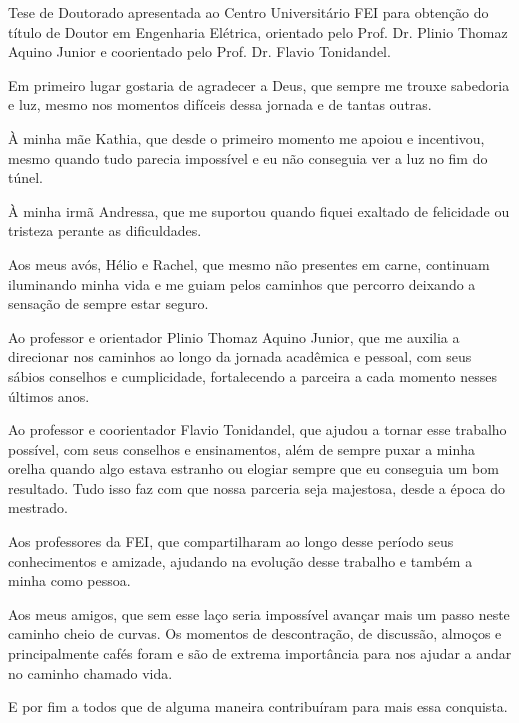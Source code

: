\maketitle{}

\begin{folhaderosto}
Tese de Doutorado apresentada ao Centro Universitário FEI para obtenção do título de Doutor em Engenharia Elétrica, orientado pelo Prof. Dr. Plinio Thomaz Aquino Junior e coorientado pelo Prof. Dr. Flavio Tonidandel.
\end{folhaderosto}

\fichacatalografica



\begin{agradecimentos}
Em primeiro lugar gostaria de agradecer a Deus, que sempre me trouxe sabedoria e luz, mesmo nos momentos difíceis dessa jornada e de tantas outras.

À minha mãe Kathia, que desde o primeiro momento me apoiou e incentivou, mesmo quando tudo parecia impossível e eu não conseguia ver a luz no fim do túnel.

À minha irmã Andressa, que me suportou quando fiquei exaltado de felicidade ou tristeza perante as dificuldades.

Aos meus avós, Hélio e Rachel, que mesmo não presentes em carne, continuam iluminando minha vida e me guiam pelos caminhos que percorro deixando a sensação de sempre estar seguro.

Ao professor e orientador Plinio Thomaz Aquino Junior, que me auxilia a direcionar nos caminhos ao longo da jornada acadêmica e pessoal, com seus sábios conselhos e cumplicidade, fortalecendo a parceira a cada momento nesses últimos anos.

Ao professor e coorientador Flavio Tonidandel, que ajudou a tornar esse trabalho possível, com seus conselhos e ensinamentos, além de sempre puxar a minha orelha quando algo estava estranho ou elogiar sempre que eu conseguia um bom resultado. Tudo isso faz com que nossa parceria seja majestosa, desde a época do mestrado.

Aos professores da FEI, que compartilharam ao longo desse período seus conhecimentos e amizade, ajudando na evolução desse trabalho e também a minha como pessoa.

Aos meus amigos, que sem esse laço seria impossível avançar mais um passo neste caminho cheio de curvas. Os momentos de descontração, de discussão, almoços e principalmente cafés foram e são de extrema importância para nos ajudar a andar no caminho chamado vida.

E por fim a todos que de alguma maneira contribuíram para mais essa conquista.

\end{agradecimentos}

